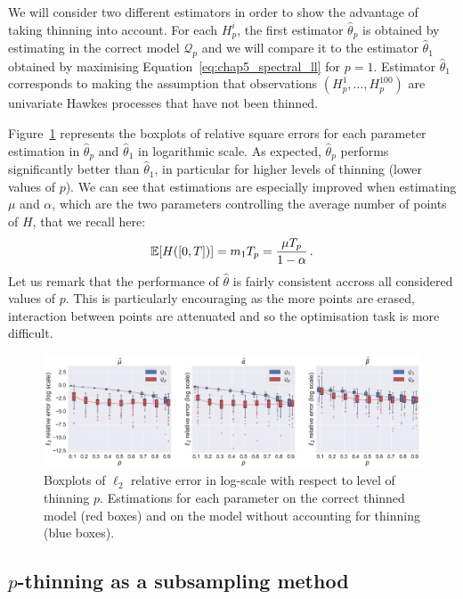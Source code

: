     We will consider two different estimators in order to show the advantage of taking thinning into account.
    For each $H_p^i$, the first estimator $\hat \theta_p$ is obtained by estimating in the correct model $\mathcal{Q}_p$ 
    and we will compare it to the estimator $\hat \theta_1$ obtained by maximising Equation~\eqref{eq:chap5_spectral_ll}
    for $p=1$.
    Estimator $\hat \theta_1$ corresponds to making the assumption that observations $(H_p^1, \ldots, H_p^{100})$
    are univariate Hawkes processes that have not been thinned.

    Figure~\ref{fig:chap5_l2_error_same_information} represents the boxplots of relative square errors for each parameter estimation in $\hat \theta_p$ and $\hat \theta_1$ in logarithmic scale.
    As expected, $\hat \theta_p$ performs significantly better than $\hat \theta_1$, 
    in particular for higher levels of thinning (lower values of $p$).
    We can see that estimations are especially improved when estimating $\mu$ and $\alpha$,
    which are the two parameters controlling the average number of points of $H$, that we recall here:
    \[{\mathbb E}[H([0, T])] = m_1 T_p = \frac{\mu T_p}{1-\alpha}\,.\]
    Let us remark that the performance of $\hat \theta$ is fairly consistent accross all considered values of $p$.
    This is particularly encouraging as the more points are erased, 
    interaction between points are attenuated and so the optimisation task is more difficult.

    \begin{figure}[!ht]
        \centering
        \includegraphics[width=1.0\textwidth]{images/chapter5/l2_error_same_information.pdf} 
        \caption{Boxplots of $\ell_2$ relative error in log-scale with respect to level of thinning $p$. Estimations for each parameter on the correct thinned model (red boxes) and on the model without accounting for thinning (blue boxes).
        }
        \label{fig:chap5_l2_error_same_information}
    \end{figure}

    \subsection{$p$-thinning as a subsampling method}\label{sec:chap5_subsampling_numerical}
    
